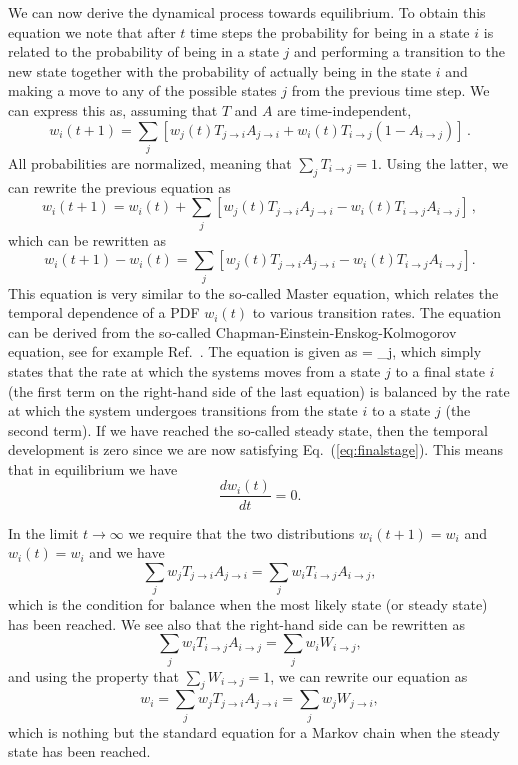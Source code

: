 We can now derive the dynamical process towards 
equilibrium. To obtain this equation we note that after $t$ time steps the probability for being in a state $i$ is related 
to the probability of being in a state $j$ and performing a transition to the new state together with the probability of actually being in the state $i$ and making a move to any of the possible states $j$ from the previous time step.
We can express this as, assuming that $T$ and $A$ are time-independent, 
\[
w_i(t+1) = \sum_j \left [
w_j(t)T_{j\rightarrow i} A_{j\rightarrow i} 
+w_i(t)T_{i\rightarrow j}\left ( 1- A_{i\rightarrow j} \right)
\right ] \,.
\]
All probabilities are normalized, meaning that 
$\sum_j T_{i\rightarrow j} = 1$. Using the latter, we can rewrite the previous equation as
\[
w_i(t+1) = w_i(t) +
 \sum_j \left [
w_j(t)T_{j\rightarrow i} A_{j\rightarrow i} 
-w_i(t)T_{i\rightarrow j}A_{i\rightarrow j}\right ] \,,
\]
which can be rewritten as 
\[
w_i(t+1)-w_i(t) =  \sum_j \left [w_j(t)T_{j\rightarrow i} A_{j\rightarrow i} 
-w_i(t)T_{i\rightarrow j}A_{i\rightarrow j}\right ] .
\]
This equation is very similar to the so-called Master equation, which relates the temporal dependence of 
a PDF $w_i(t)$ to various transition rates. The equation can be derived from the so-called 
Chapman-Einstein-Enskog-Kolmogorov equation, see for example Ref.~\cite{cd2001}. The equation is given as 
\be
\label{eq:masterequation}
 = \sum_j,
\ee 
which simply states that the rate at which the systems moves from a state $j$
to a final state $i$ (the first term on the right-hand side of the last equation) is balanced by the rate at which the system undergoes transitions from the state $i$ to a state $j$ (the second term). If we have reached the so-called steady state, then the temporal development is zero since we are now satisfying
Eq.~(\ref{eq:finalstage}). This  means that in equilibrium we have
\[
\frac{d w_i(t)}{dt} = 0.
\]


In the limit $t\rightarrow \infty$ we require that the  two distributions $w_i(t+1)=w_i$ and $w_i(t)=w_i$
and we have 
\[
 \sum_j w_jT_{j\rightarrow i} A_{j\rightarrow i}= \sum_j w_iT_{i\rightarrow j}A_{i\rightarrow j},
\]
which is the condition for balance when the most likely state (or steady state) has been reached.
We see also that the right-hand side  can be  rewritten as 
\[ 
\sum_j w_iT_{i\rightarrow j}A_{i\rightarrow j}= \sum_j w_iW_{i\rightarrow j},
\]
and using the property that $\sum_j W_{i\rightarrow j}=1$, we can rewrite our equation
as
\[
w_i= \sum_j w_jT_{j\rightarrow i} A_{j\rightarrow i}= \sum_j w_j W_{j\rightarrow i},
\]
which is nothing but the standard equation for a Markov chain when the steady state has been reached.

